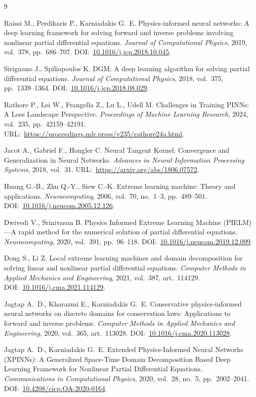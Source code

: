 \documentclass{misisarticle}
\begin{document}
\begin{thebibliography}{9}

Raissi M., Perdikaris P., Karniadakis G.~E. Physics-informed neural networks: A deep learning framework for solving forward and inverse problems involving nonlinear partial differential equations. \textit{Journal of Computational Physics}, 2019, vol.~378, pp.~686--707. DOI:~\url{10.1016/j.jcp.2018.10.045}.

Sirignano J., Spiliopoulos K. DGM: A deep learning algorithm for solving partial differential equations. \textit{Journal of Computational Physics}, 2018, vol.~375, pp.~1339--1364. DOI:~\url{10.1016/j.jcp.2018.08.029}.

Rathore P., Lei W., Frangella Z., Lu L., Udell M. Challenges in Training PINNs: A Loss Landscape Perspective. \textit{Proceedings of Machine Learning Research}, 2024, vol.~235, pp.~42159--42191. URL:~\url{https://proceedings.mlr.press/v235/rathore24a.html}.

Jacot A., Gabriel F., Hongler C. Neural Tangent Kernel: Convergence and Generalization in Neural Networks. \textit{Advances in Neural Information Processing Systems}, 2018, vol.~31. URL:~\url{https://arxiv.org/abs/1806.07572}.

Huang G.-B., Zhu Q.-Y., Siew C.-K. Extreme learning machine: Theory and applications. \textit{Neurocomputing}, 2006, vol.~70, no.~1--3, pp.~489--501. DOI:~\url{10.1016/j.neucom.2005.12.126}.

Dwivedi V., Srinivasan B. Physics Informed Extreme Learning Machine (PIELM)---A rapid method for the numerical solution of partial differential equations. \textit{Neurocomputing}, 2020, vol.~391, pp.~96--118. DOI:~\url{10.1016/j.neucom.2019.12.099}.

Dong S., Li Z. Local extreme learning machines and domain decomposition for solving linear and nonlinear partial differential equations. \textit{Computer Methods in Applied Mechanics and Engineering}, 2021, vol.~387, art.~114129. DOI:~\url{10.1016/j.cma.2021.114129}.

Jagtap A.~D., Kharazmi E., Karniadakis G.~E. Conservative physics-informed neural networks on discrete domains for conservation laws: Applications to forward and inverse problems. \textit{Computer Methods in Applied Mechanics and Engineering}, 2020, vol.~365, art.~113028. DOI:~\url{10.1016/j.cma.2020.113028}.

Jagtap A.~D., Karniadakis G.~E. Extended Physics-Informed Neural Networks (XPINNs): A Generalized Space-Time Domain Decomposition Based Deep Learning Framework for Nonlinear Partial Differential Equations. \textit{Communications in Computational Physics}, 2020, vol.~28, no.~5, pp.~2002--2041. DOI:~\url{10.4208/cicp.OA-2020-0164}.

\end{thebibliography}
\end{document}
